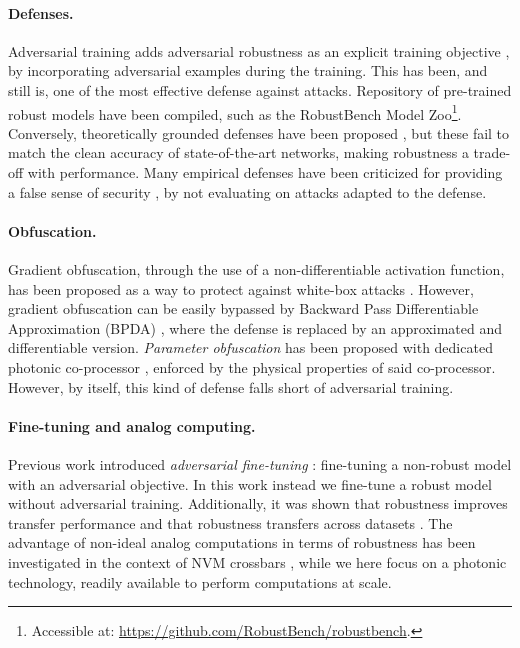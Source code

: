 \documentclass{article}
\begin{document}
\paragraph{Defenses.} Adversarial training adds adversarial robustness as an explicit training objective \cite{Goodfellow2015ExplainingAH,madry2017towards}, by incorporating adversarial examples during the training. This has been, and still is, one of the most effective defense against attacks. Repository of pre-trained robust models have been compiled, such as the RobustBench Model Zoo\footnote{Accessible at: \url{https://github.com/RobustBench/robustbench}.}. Conversely, theoretically grounded defenses have been proposed \citep{lecuyer2018certified,KolterRandomizedSmoothing,araujo2020,pinot2019theoretical,wong2018scaling,wong2018provable}, but these fail to match the clean accuracy of state-of-the-art networks, making robustness a trade-off with performance. Many empirical defenses have been criticized for providing a false sense of security \cite{athalye2018obfuscated,tramer2019adversarial}, by not evaluating on attacks adapted to the defense.  

\paragraph{Obfuscation.} Gradient obfuscation, through the use of a non-differentiable activation function, has been proposed as a way to protect against white-box attacks \cite{papernot2017practical}. However, gradient obfuscation can be easily bypassed by Backward Pass Differentiable Approximation (BPDA) \cite{athalye2018obfuscated}, where the defense is replaced by an approximated and differentiable version. \emph{Parameter obfuscation} has been proposed with dedicated photonic co-processor \cite{Cappelli2021AdversarialRB}, enforced by the physical properties of said co-processor. However, by itself, this kind of defense falls short of adversarial training. 

\paragraph{Fine-tuning and analog computing.} Previous work introduced \textit{adversarial fine-tuning} \cite{Jeddi2020ASF}: fine-tuning a non-robust model with an adversarial objective. In this work instead we fine-tune a robust model without adversarial training. Additionally, it was shown that robustness improves transfer performance \cite{Salman2020DoAR} and that robustness transfers across datasets \cite{Shafahi2020AdversariallyRT}. The advantage of non-ideal analog computations in terms of robustness has been investigated in the context of NVM crossbars \cite{roy2020robustness}, while we here focus on a photonic technology, readily available to perform computations at scale.
\end{document}
